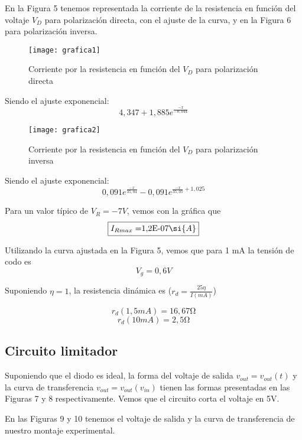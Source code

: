 \documentclass[a4paper,12pt,spanish]{article}
\begin{document}
En la Figura 5 tenemos representada la corriente de la resistencia en función del voltaje $V_D$ para polarización directa, con el ajuste de la curva, y en la Figura 6 para polarización inversa.

\begin{figure}[H]
	\centering
	\texttt{[image: grafica1]}
	\caption{Corriente por la resistencia en función del $V_D$ para polarización directa}
	\label{fig:grafica1}
\end{figure}


Siendo el ajuste exponencial:
\[4,347 + 1,885 e^{\frac{-x}{-0,044}}\]

\begin{figure}[H]
	\centering
	\texttt{[image: grafica2]}
	\caption{Corriente por la resistencia en función del $V_D$ para polarización inversa}
	\label{fig:grafica2}
\end{figure}




Siendo el ajuste exponencial:
\[0,091 e^{\frac{-x}{35,04}}- 0,091 e^{\frac{-x}{35,05}+ 1,025}\]


Para un valor típico de $V_R = -7 \si{V}$, vemos con la gráfica que 
\[\boxed{I_{Rmax} = $1,2E-07$  \si{A} } \]

Utilizando la curva ajustada en la Figura 5, vemos que para 1 mA la tensión de codo es 
\[ \boxed{V_g = 0,6 \si{V}}
\]

Suponiendo $\eta = 1$, la resistencia dinámica es ($r_d = \frac{25\eta}{I(\si{mA})}$)

\[r_d (1,5 \si{mA}) = 16,67 \si{\ohm} \]
\[r_d (10  \si{mA}) = 2,5 \si{\ohm} \]

\subsection*{Circuito limitador}

Suponiendo que el diodo es ideal, la forma del voltaje de salida $v_{out}= v_{out}(t)$ y la curva de transferencia $v_{out} = v_{out}(v_{in})$ tienen las formas presentadas en las Figuras 7 y 8 respectivamente. Vemos que el circuito corta el voltaje en 5V.

En las Figuras 9 y 10 tenemos el voltaje de salida y la curva de transferencia de nuestro montaje experimental.
\end{document}
